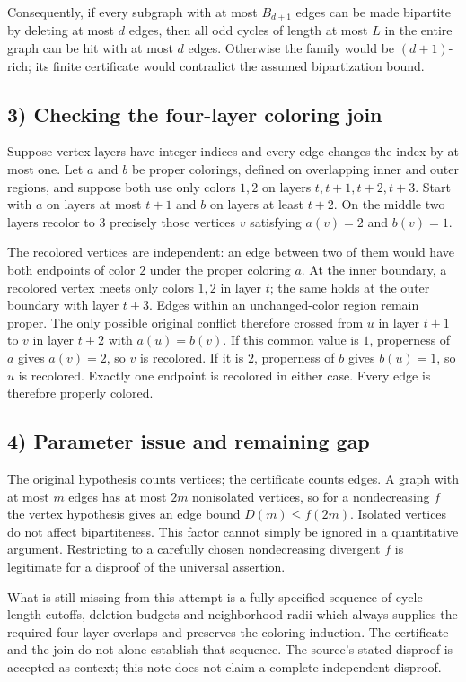 Consequently, if every subgraph with at most $B_{d+1}$ edges can be
made bipartite by deleting at most $d$ edges, then all odd cycles
of length at most $L$ in the entire graph can be hit with at most
$d$ edges. Otherwise the family would be $(d+1)$-rich; its finite
certificate would contradict the assumed bipartization bound.

\subsection{3) Checking the four-layer coloring join}
Suppose vertex layers have integer indices and every edge changes
the index by at most one. Let $a$ and $b$ be proper colorings,
defined on overlapping inner and outer regions, and suppose both
use only colors $1,2$ on layers $t,t+1,t+2,t+3$.
Start with $a$ on layers at most $t+1$ and $b$ on layers at least
$t+2$. On the middle two layers recolor to $3$ precisely those
vertices $v$ satisfying $a(v)=2$ and $b(v)=1$.

The recolored vertices are independent: an edge between two of them
would have both endpoints of color $2$ under the proper coloring
$a$. At the inner boundary, a recolored vertex meets only colors
$1,2$ in layer $t$; the same holds at the outer boundary with layer
$t+3$. Edges within an unchanged-color region remain proper.
The only possible original conflict therefore crossed from $u$
in layer $t+1$ to $v$ in layer $t+2$ with $a(u)=b(v)$.
If this common value is $1$, properness of $a$ gives $a(v)=2$,
so $v$ is recolored. If it is $2$, properness of $b$ gives
$b(u)=1$, so $u$ is recolored. Exactly one endpoint is recolored
in either case. Every edge is therefore properly colored.

\subsection{4) Parameter issue and remaining gap}
The original hypothesis counts vertices; the certificate counts
edges. A graph with at most $m$ edges has at most $2m$ nonisolated
vertices, so for a nondecreasing $f$ the vertex hypothesis gives
an edge bound $D(m)\leq f(2m)$. Isolated vertices do not affect
bipartiteness. This factor cannot simply be ignored in a quantitative
argument. Restricting to a carefully chosen nondecreasing divergent
$f$ is legitimate for a disproof of the universal assertion.

What is still missing from this attempt is a fully specified sequence
of cycle-length cutoffs, deletion budgets and neighborhood radii
which always supplies the required four-layer overlaps and preserves
the coloring induction. The certificate and the join do not alone
establish that sequence. The source's stated disproof is accepted as
context; this note does not claim a complete independent disproof.

